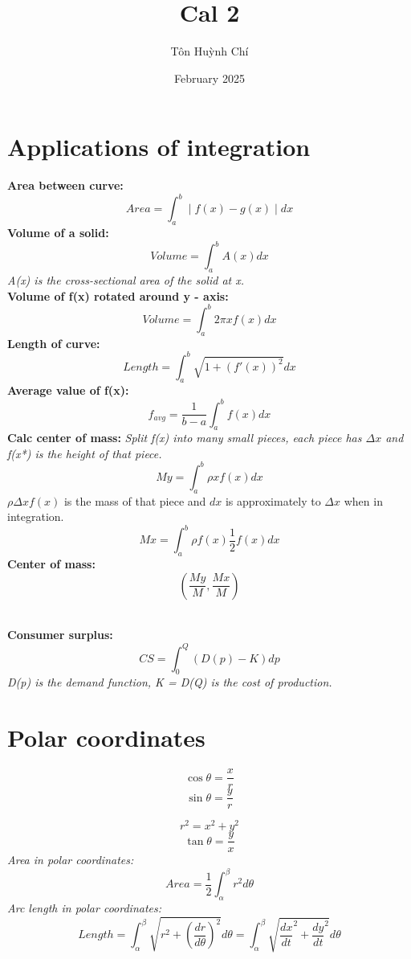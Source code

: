 \documentclass{article}
\title{Cal 2}
\author{Tôn Huỳnh Chí}
\date{February 2025}
\begin{document}
\maketitle

\section{Applications of integration}

\textbf{Area between curve: } \[Area = \int_{a}^{b} \mid f(x) - g(x) \mid dx \]
\textbf{Volume of a solid: } \[Volume = \int_{a}^{b} A(x) dx\] 
\textit{A(x) is the cross-sectional area of the solid at x.}\\
\textbf{Volume of f(x) rotated around y - axis: } 
    \[Volume = \int_{a}^{b} 2 \pi x f(x) dx \]
\textbf{Length of curve: } \[Length = \int_{a}^{b} \sqrt{1 + (f'(x))^2} dx \]
\textbf{Average value of f(x): } \[f_{avg} = \frac{1}{b - a} \int_{a}^{b} f(x) dx \]
\textbf{Calc center of mass: } 
\textit{Split f(x) into many small pieces, each piece has $\Delta x$ and f(x*) is the height of that piece.}\
\[My = \int_{a}^{b} \rho x f(x) dx \]
$\rho \Delta x f(x)$ is the mass of that piece and $dx$ is approximately to $\Delta x$ when in integration. \\
\[Mx = \int_{a}^{b} \rho f(x) \frac{1}{2}  f(x) dx \]
\textbf{Center of mass: } \[(\frac{My}{M}, \frac{Mx}{M})\]\

\textbf{Consumer surplus: } \[CS = \int_{0}^{Q} (D(p) - K) dp \]
\textit{D(p) is the demand function, K = D(Q) is the cost of production.}\\

\section{Polar coordinates}

\[\cos \theta = \frac{x}{r}\]
\[\sin \theta = \frac{y}{r}\]

\[r^2 = x^2 + y^2\]
\[\tan \theta = \frac{y}{x}\]
\textit{Area in polar coordinates: } \[Area = \frac{1}{2} \int_{\alpha}^{\beta} r^2 d\theta\]
\textit{Arc length in polar coordinates: } \[Length = \int_{\alpha}^{\beta} \sqrt{r^2 + (\frac{dr}{d\theta})^2} d\theta = \int_{\alpha}^{\beta} \sqrt{\frac{dx}{dt} ^ 2 + \frac{dy}{dt} ^ 2} d\theta\]
\end{document}
